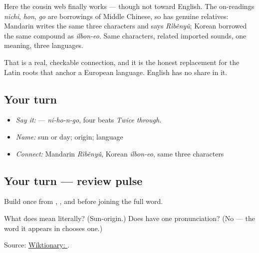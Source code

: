 \begin{cousinweb}
Here the cousin web finally works — though not toward English. The on-readings \emph{nichi}, \emph{hon}, \emph{go} are borrowings of Middle Chinese, so  has genuine relatives: Mandarin writes the same three characters and says \emph{Rìběnyǔ}; Korean borrowed the same compound as \emph{ilbon-eo}. Same characters, related imported sounds, one meaning, three languages.

That is a real, checkable connection, and it is the honest replacement for the Latin roots that anchor a European language. English has no share in it.
\end{cousinweb}

\subsection*{Your turn}
\begin{itemize}
\raggedright
  \item \emph{Say it:} \textbf{} — \emph{ni-ho-n-go}, four beats \emph{Twice through.}
  \item \emph{Name:}  sun or day;  origin;  language
  \item \emph{Connect:} Mandarin \emph{Rìběnyǔ}, Korean \emph{ilbon-eo}, same three characters
\end{itemize}

\subsection*{Your turn — review pulse}
Build \textbf{} once from \textbf{}, \textbf{}, and \textbf{} before joining the full word.

\begin{tcolorbox}[breakable,colback=teal!4,colframe=teal!35!black,title={Before you move on}]
What does  mean literally? (Sun-origin.) Does  have one pronunciation? (No — the word it appears in chooses one.)

Source: \href{https://en.wiktionary.org/wiki/\%E6\%97\%A5\%E6\%9C\%AC\%E8\%AA\%9E}{Wiktionary: }.
\end{tcolorbox}
